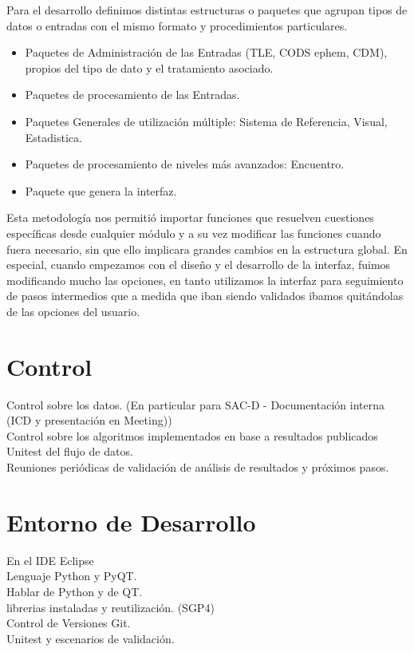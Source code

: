 Para el desarrollo definimos distintas estructuras o paquetes que agrupan tipos de datos o entradas con el mismo formato y procedimientos particulares.\\
\begin{itemize}
 \item Paquetes de Administraci\'on de las Entradas (TLE, CODS ephem, CDM), propios del tipo de dato y el tratamiento asociado.
 \item Paquetes de procesamiento de las Entradas.
 \item Paquetes Generales de utilizaci\'on m\'ultiple: Sistema de Referencia, Visual, Estadistica.
 \item Paquetes de procesamiento de niveles m\'as avanzados: Encuentro. 
 \item Paquete que genera la interfaz.
\end{itemize}

Esta metodolog\'ia nos permiti\'o importar funciones que resuelven cuestiones espec\'ificas desde cualquier  m\'odulo y a su vez modificar las funciones cuando fuera necesario, sin que ello implicara grandes cambios en la estructura global. En especial, cuando empezamos con el diseño y el desarrollo de la interfaz, fuimos modificando mucho las opciones, en tanto utilizamos la interfaz para seguimiento de pasos intermedios que a medida que iban siendo validados ibamos quit\'andolas de las opciones del usuario.\\

\section{Control}
Control sobre los datos. (En particular para SAC-D - Documentaci\'on interna (ICD y presentaci\'on en Meeting))\\
Control sobre los algoritmos implementados en base a resultados publicados\\
Unitest del flujo de datos.\\
Reuniones peri\'odicas de validaci\'on de an\'alisis de resultados y pr\'oximos pasos.\\



\section{Entorno de Desarrollo}
En el IDE Eclipse\\
Lenguaje Python y PyQT.\\
Hablar de Python y de QT.\\
librerias instaladas y reutilizaci\'on. (SGP4)\\
Control de Versiones Git.\\
Unitest y escenarios de validaci\'on.


